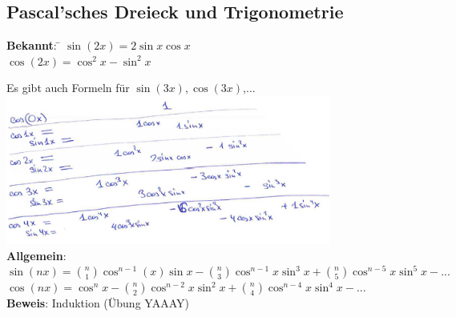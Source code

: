 \subsection{Pascal'sches Dreieck und Trigonometrie}
\begin{tabbing}
	\textbf{Bekannt}: \= $\sin(2x) = 2\sin x \cos x$\\
	\> $\cos(2x)=\cos^2x-\sin^2x$
\end{tabbing}
Es gibt auch Formeln für $\sin(3x) , \cos(3x)$,...\smallskip\\
\includegraphics[width=0.8\textwidth]{img/ayy.PNG}\medskip\\
\textbf{Allgemein}:\\
$\sin(nx) = \binom{n}{1}\cos^{n-1}(x) \sin x - \binom{n}{3}\cos^{n-1}x \sin^3x + \binom{n}{5} \cos^{n-5}x \sin^5x-...$\medskip\\
$\cos(nx) = \cos^nx - \binom{n}{2}\cos^{n-2}x\sin^2x+\binom{n}{4}\cos^{n-4}x\sin^4x-...$\medskip\\
\textbf{Beweis}: Induktion (Übung YAAAY)
